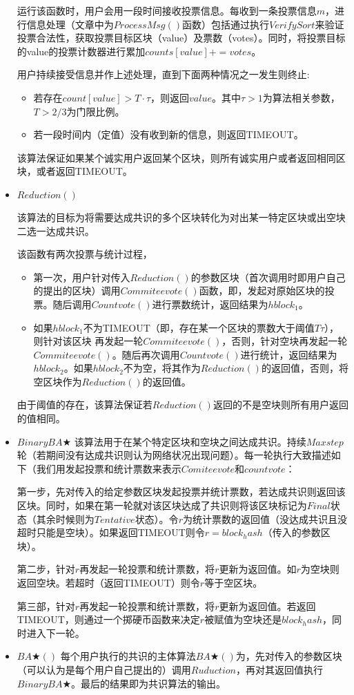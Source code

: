 \begin{itemize}
	运行该函数时，用户会用一段时间接收投票信息。每收到一条投票信息$m$，进行信息处理（文章中为$ProcessMsg()$函数）包括通过执行$VerifySort$来验证投票合法性，获取投票目标区块（value）及票数（votes）。同时，将投票目标的value的投票计数器进行累加$counts[value]+=votes$。
	
	用户持续接受信息并作上述处理，直到下面两种情况之一发生则终止:
	\begin{itemize}
		\item 若存在$count[value]>T\cdot \tau$，则返回$value$。其中$\tau>1$为算法相关参数，$T>2/3$为门限比例。
		\item 若一段时间内（定值）没有收到新的信息，则返回TIMEOUT。
	\end{itemize}
	该算法保证如果某个诚实用户返回某个区块，则所有诚实用户或者返回相同区块，或者返回TIMEOUT。
    \item $Reduction()$
    
    该算法的目标为将需要达成共识的多个区块转化为对出某一特定区块或出空块二选一达成共识。
    
    该函数有两次投票与统计过程，
    \begin{itemize}   
    \item  第一次，用户针对传入$Reduction()$的参数区块（首次调用时即用户自己的提出的区块）调用$Commiteevote()$函数，即，发起对原始区块的投票。随后调用$Countvote()$进行票数统计，返回结果为$hblock_1$。
    
    \item 如果$hblock_1$不为TIMEOUT（即，存在某一个区块的票数大于阈值$T\tau$），则针对该区块
      再发起一轮$Commiteevote()$，否则，针对空块再发起一轮$Commiteevote()$。随后再次调用$Countvote()$进行统计，返回结果为$hblock_2$。如果$hblock_2$不为空，将其作为$Reduction()$的返回值，否则，将空区块作为$Reduction()$的返回值。
     \end{itemize}
     由于阈值的存在，该算法保证若$Reduction()$返回的不是空块则所有用户返回的值相同。
     
     \item $BinaryBA\bigstar$
     该算法用于在某个特定区块和空块之间达成共识。持续$Maxstep$轮（若期间没有达成共识则认为网络状况出现问题）。每一轮执行大致描述如下（我们用发起投票和统计票数来表示$Comiteevote$和$countvote$：
     
     第一步，先对传入的给定参数区块发起投票并统计票数，若达成共识则返回该区块。同时，如果在第一轮就对该区块达成了共识则将该区块标记为$Final$状态（其余时候则为$Tentative$状态）。令$r$为统计票数的返回值（没达成共识且没超时只能是空块）。如果返回TIMEOUT则令$r=block_hash$（传入的参数区块）。
     
     第二步，针对$r$再发起一轮投票和统计票数，将$r$更新为返回值。如$r$为空块则返回空块。若超时（返回TIMEOUT）则令$r$等于空区块。
     
     第三部，针对$r$再发起一轮投票和统计票数，将$r$更新为返回值。若返回TIMEOUT，则通过一个掷硬币函数来决定$r$被赋值为空块还是$block_hash$，同时进入下一轮。
     
     \item $BA\bigstar()$
     每个用户执行的共识的主体算法$BA\bigstar()$为，先对传入的参数区块（可以认为是每个用户自己提出的）调用$Ruduction$，再对其返回值执行$BinaryBA\bigstar$。最后的结果即为共识算法的输出。	
\end{itemize}

